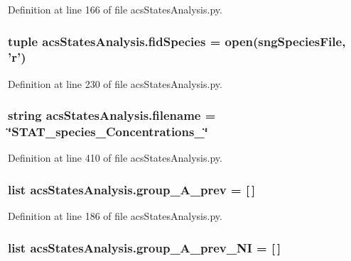 Definition at line 166 of file acs\-States\-Analysis.\-py.

\hypertarget{a00104_afd34aa2ef2c410c2d71007bac0a121fd}{
\subsubsection[{fid\-Species}]{\setlength{\rightskip}{0pt plus 5cm}tuple acs\-States\-Analysis.\-fid\-Species = open(sng\-Species\-File, '{\bf r}')}}\label{a00104_afd34aa2ef2c410c2d71007bac0a121fd}


Definition at line 230 of file acs\-States\-Analysis.\-py.

\hypertarget{a00104_a69b59a10e5dc62a6e0d5325e9a27e5c6}{
\subsubsection[{filename}]{\setlength{\rightskip}{0pt plus 5cm}string acs\-States\-Analysis.\-filename = \char`\"{}S\-T\-A\-T\-\_\-species\-\_\-\-Concentrations\-\_\-\char`\"{}}}\label{a00104_a69b59a10e5dc62a6e0d5325e9a27e5c6}


Definition at line 410 of file acs\-States\-Analysis.\-py.

\hypertarget{a00104_a1dd2f2c85f697e454c99be1a157d6c17}{
\subsubsection[{group\-\_\-\-A\-\_\-prev}]{\setlength{\rightskip}{0pt plus 5cm}list acs\-States\-Analysis.\-group\-\_\-\-A\-\_\-prev = \mbox{[}$\,$\mbox{]}}}\label{a00104_a1dd2f2c85f697e454c99be1a157d6c17}


Definition at line 186 of file acs\-States\-Analysis.\-py.

\hypertarget{a00104_a4d77133a6a303d9486944707f3310cf8}{
\subsubsection[{group\-\_\-\-A\-\_\-prev\-\_\-\-N\-I}]{\setlength{\rightskip}{0pt plus 5cm}list acs\-States\-Analysis.\-group\-\_\-\-A\-\_\-prev\-\_\-\-N\-I = \mbox{[}$\,$\mbox{]}}}\label{a00104_a4d77133a6a303d9486944707f3310cf8}


